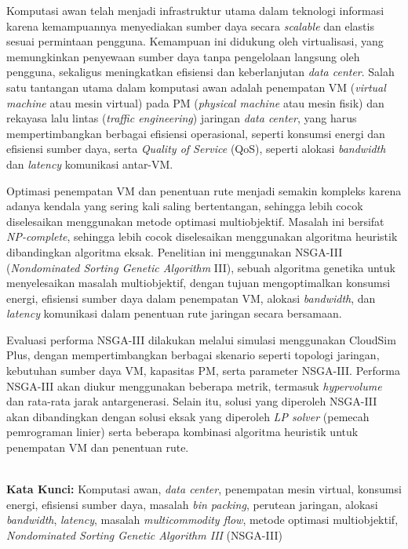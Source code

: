 Komputasi awan telah menjadi infrastruktur utama dalam teknologi informasi karena kemampuannya menyediakan sumber daya secara \textit{scalable} dan elastis sesuai permintaan pengguna. Kemampuan ini didukung oleh virtualisasi, yang memungkinkan penyewaan sumber daya tanpa pengelolaan langsung oleh pengguna, sekaligus meningkatkan efisiensi dan keberlanjutan \textit{data center}. Salah satu tantangan utama dalam komputasi awan adalah penempatan VM (\textit{virtual machine} atau mesin virtual) pada PM (\textit{physical machine} atau mesin fisik) dan rekayasa lalu lintas (\textit{traffic engineering}) jaringan \textit{data center}, yang harus mempertimbangkan berbagai efisiensi operasional, seperti konsumsi energi dan efisiensi sumber daya, serta \textit{Quality of Service} (QoS), seperti alokasi \textit{bandwidth} dan \textit{latency} komunikasi antar-VM.

Optimasi penempatan VM dan penentuan rute menjadi semakin kompleks karena adanya kendala yang sering kali saling bertentangan, sehingga lebih cocok diselesaikan menggunakan metode optimasi multiobjektif. Masalah ini bersifat \textit{NP-complete}, sehingga lebih cocok diselesaikan menggunakan algoritma heuristik dibandingkan algoritma eksak. Penelitian ini menggunakan NSGA-III (\textit{Nondominated Sorting Genetic Algorithm} III), sebuah algoritma genetika untuk menyelesaikan masalah multiobjektif, dengan tujuan mengoptimalkan konsumsi energi, efisiensi sumber daya dalam penempatan VM, alokasi \textit{bandwidth}, dan \textit{latency} komunikasi dalam penentuan rute jaringan secara bersamaan.

Evaluasi performa NSGA-III dilakukan melalui simulasi menggunakan CloudSim Plus, dengan mempertimbangkan berbagai skenario seperti topologi jaringan, kebutuhan sumber daya VM, kapasitas PM, serta parameter NSGA-III. Performa NSGA-III akan diukur menggunakan beberapa metrik, termasuk \textit{hypervolume} dan rata-rata jarak antargenerasi. Selain itu, solusi yang diperoleh NSGA-III akan dibandingkan dengan solusi eksak yang diperoleh \textit{LP solver} (pemecah pemrograman linier) serta beberapa kombinasi algoritma heuristik untuk penempatan VM dan penentuan rute.

\\
\textbf{Kata Kunci: }Komputasi awan, \textit{data center}, penempatan mesin virtual, konsumsi energi, efisiensi sumber daya, masalah \textit{bin packing}, perutean jaringan, alokasi \textit{bandwidth}, \textit{latency}, masalah \textit{multicommodity flow}, metode optimasi multiobjektif, \textit{Nondominated Sorting Genetic Algorithm III} (NSGA-III) 
